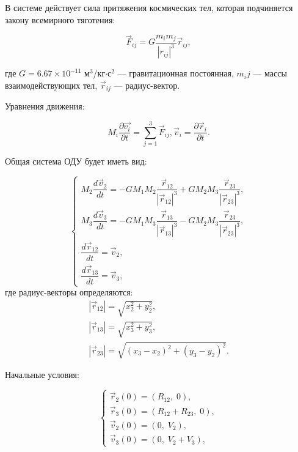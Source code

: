 \documentclass[14pt,a4paper]{extarticle}
\theoremstyle{plain}
\begin{document}
	В системе действует сила притяжения космических тел, которая подчиняется закону всемирного тяготения:
	
	\begin{equation}
		\vec{F}_{ij} = G \frac{m_i m_j}{|r_{ij}|^3} \vec{r}_{ij}, \nonumber
	\end{equation}
	
	где $G = 6.67 \times 10^{-11}$ м$^3$/кг$\cdot$с$^2$ — гравитационная постоянная,
	$m_ij$ — массы взаимодействующих тел, $\vec{r}_{ij}$ — радиус-вектор.
	
	Уравнения движения:
	
	\begin{equation}
		M_{i}\dfrac{\partial\vec{v_{i}}}{\partial t}=\sum_{j=1}^{3}\vec{F}_{ij}, \vec{v}_{i}=\frac{\partial\vec{r}_{i}}{\partial t}. \nonumber
	\end{equation}
	
	Общая система ОДУ будет иметь вид:
	
	\begin{equation}
		\begin{cases}
			M_2 \dfrac{d \vec{v}_2}{dt} = -G M_1 M_2 \dfrac{\vec{r}_{12}}{|\vec{r}_{12}|^3} + G M_2 M_3 \dfrac{\vec{r}_{23}}{|\vec{r}_{23}|^3}, \\[12pt]
			M_3 \dfrac{d \vec{v}_{3}}{dt} = -G M_1 M_3 \dfrac{\vec{r}_{13}}{|\vec{r}_{13}|^3} - G M_2 M_3 \dfrac{\vec{r}_{23}}{|\vec{r}_{23}|^3},\\
			\dfrac{d\vec{r}_{12}}{dt} = \vec{v}_2, \\[6pt]
			\dfrac{d\vec{r}_{13}}{dt} = \vec{v}_3,
		\end{cases}
		\label{eq:two_bodies_vector}
		\nonumber
	\end{equation}
	где радиус-векторы определяются:
	\begin{equation}
		\begin{gathered}
			|\vec{r}_{12}| = \sqrt{x_2^2 + y_2^2}, \\
			|\vec{r}_{13}| = \sqrt{x_3^2 + y_3^2}, \\
			|\vec{r}_{23}| = \sqrt{(x_3 - x_2)^2 + (y_3 - y_2)^2}.
		\end{gathered}
		\nonumber
	\end{equation}
	
	Начальные условия:
	
	\begin{equation}
		\begin{cases}
			\vec{r}_2(0) = (R_{12},\; 0), \\
			\vec{r}_3(0) = (R_{12} + R_{23},\; 0), \\
			\vec{v}_2(0) = (0,\; V_2), \\
			\vec{v}_3(0) = (0,\; V_2 + V_3),
		\end{cases}
		\label{eq:initial_conditions_vector}
		\nonumber
	\end{equation}
	
\end{document}
